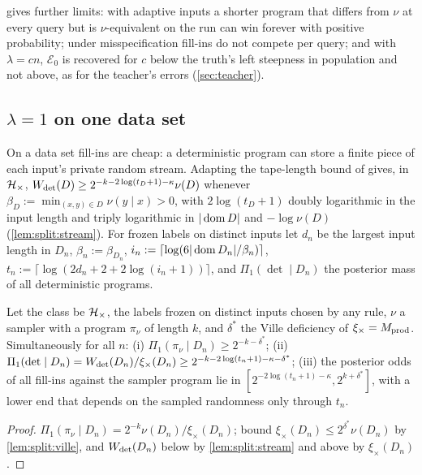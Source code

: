  gives further limits: with adaptive inputs a shorter program that differs from $\nu$ at every query but is $\nu$-equivalent on the run can win forever with positive probability; under misspecification fill-ins do not compete per query; and with $\lambda=cn$, $\mathcal E_0$ is recovered for $c$ below the truth's left steepness in population and not above, as for the teacher's errors (\cref{sec:teacher}).

\subsection{\texorpdfstring{$\lambda=1$}{lambda=1} on one data set}\label{sec:split:lambda1}

On a data set fill-ins are cheap: a deterministic program can store a finite piece of each input's private random stream. Adapting the tape-length bound of \citet[Proposition~4.6(a)]{claudeSFI2026fundamentals} %
gives, in $\mathcal{H}_{\times}$, $W_{\mathrm{det}}(D)\ge2^{-k-2\log(t_D+1)-\kappa}\nu(D)$ whenever $\beta_D:=\min_{(x,y)\in D}\nu(y\mid x)>0$, with $2\log(t_D+1)$ doubly logarithmic in the input length and triply logarithmic in $|\operatorname{dom} D|$ and $-\log\nu(D)$ (\cref{lem:split:stream}). For frozen labels on distinct inputs let $d_n$ be the largest input length in $D_n$, $\beta_n:=\beta_{D_n}$, $i_n:=\lceil\log(6|\operatorname{dom} D_n|/\beta_n)\rceil$, $t_n:=\lceil\log(2d_n+2+2\log(i_n+1))\rceil$, and $\Pi_1(\det\mid D_n)$ the posterior mass of all deterministic programs.

\begin{theorem}[SFI at $\lambda=1$]\label{thm:split:lambda1}
Let the class be $\mathcal{H}_{\times}$, the labels frozen on distinct inputs chosen by any rule, $\nu$ a sampler with a program $\pi_\nu$ of length $k$, and $\delta^*$ the Ville deficiency of $\xi_\times=M_{\mathrm{prod}}$. Simultaneously for all $n$:
(i) $\Pi_1(\pi_\nu\mid D_n)\ge2^{-k-\delta^*}$;
(ii) $\Pi_1(\det\mid D_n)=W_{\mathrm{det}}(D_n)/\xi_\times(D_n)\ge2^{-k-2\log(t_n+1)-\kappa-\delta^*}$;
(iii) the posterior odds of all fill-ins against the sampler program lie in $[2^{-2\log(t_n+1)-\kappa},2^{k+\delta^*}]$, with a lower end that depends on the sampled randomness only through $t_n$.
\end{theorem}

\begin{proof}
$\Pi_1(\pi_\nu\mid D_n)=2^{-k}\nu(D_n)/\xi_\times(D_n)$; bound $\xi_\times(D_n)\le2^{\delta^*}\nu(D_n)$ by \cref{lem:split:ville}, and $W_{\mathrm{det}}(D_n)$ below by \cref{lem:split:stream} and above by $\xi_\times(D_n)$.
\end{proof}

